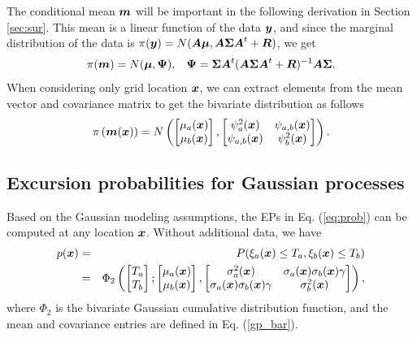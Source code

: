 \documentclass[aoas]{imsart}
\begin{document}
The conditional mean ${\boldsymbol m}$ will be important in the following derivation in Section \ref{sec:sur}. This mean is a linear function of the data ${\boldsymbol y}$, and since the marginal distribution of the data is $\pi ({\boldsymbol y})= N( {\boldsymbol A} {\boldsymbol \mu},{\boldsymbol A} {\boldsymbol \Sigma} {\boldsymbol A}^t+{\boldsymbol R})$, we get
\begin{equation}\label{distxi}
\pi(\bm)= N(\bmu , \bPsi), \hspace{3mm} \bPsi=\bSigma \bA^t (\bA \bSigma \bA^t+\bR)^{-1} \bA \bSigma.  
\end{equation}
When considering only grid location ${\boldsymbol x}$, we can extract elements from the mean vector and covariance matrix to get the bivariate distribution as follows 
\begin{equation}\label{dist_mxi}
\pi \left( \bm(\bx) \right) 
= N 
\left( 
\begin{bmatrix}
\mu_{a}(\bx) \\
\mu_{b}(\bx)
\end{bmatrix},
\begin{bmatrix}
\psi^2_{a}(\bx) & \psi_{a,b}(\bx)\\
\psi_{a,b}(\bx) & \psi^2_{b}(\bx)
\end{bmatrix}
\right).
\end{equation}


\subsection{Excursion probabilities for Gaussian processes}

Based on the Gaussian modeling assumptions, the EPs in Eq. (\ref{eq:prob}) can be computed at any location ${\boldsymbol x}$. Without additional data, we have
\begin{eqnarray}\label{eq:prob_mv0}
 p(\bx) &=& P(\xi_a(\bx) \leq T_a, \xi_b(\bx) \leq T_b) \nonumber \\
 &=& \Phi_2 \begin{pmatrix} 
\begin{bmatrix} T_a\\
T_b
\end{bmatrix};
\begin{bmatrix} \mu_{a}(\bx)\\
\mu_{b}(\bx)
\end{bmatrix},\begin{bmatrix}
\sigma_{a}^2(\bx) & \sigma_{a}(\bx)\sigma_{b}(\bx) \gamma  \\
\sigma_{a}(\bx)\sigma_{b}(\bx) \gamma  & \sigma_{b}^2(\bx)  
\end{bmatrix}\end{pmatrix},
\end{eqnarray}
where $\Phi_2$ is the bivariate Gaussian cumulative distribution function, and the mean and covariance entries are defined in Eq. (\ref{gp_bar}). 
\end{document}

